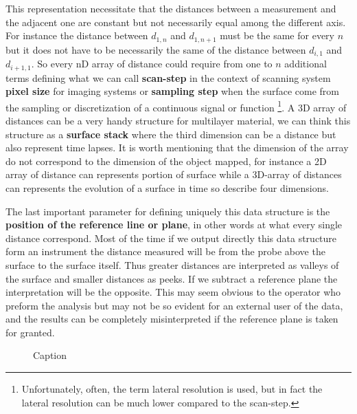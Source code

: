 This representation necessitate that the distances between a measurement and the adjacent one are constant but not necessarily equal among the different axis. For instance the distance between $d_{1,n}$ and $d_{1,n+1}$ must be the same for every $n$ but it does not have to be necessarily the same of the distance between $d_{i,1}$ and  $d_{i+1,1}$. So every nD array of distance could require from one to $n$ additional terms defining what we can call \textbf{scan-step} in the context of scanning system \textbf{pixel size} for imaging systems or \textbf{sampling step} when the surface come from the sampling or discretization of a continuous signal or function \footnote{Unfortunately, often, the term lateral resolution is used, but in fact the lateral resolution can be much lower compared to the scan-step.}. A 3D array of distances can be a very handy structure for multilayer material, we can think this structure as a \textbf{surface stack} where the third dimension can be a distance but also represent time lapses. It is worth mentioning that the dimension of the array do not correspond to the dimension of the object mapped, for instance a 2D array of distance can represents portion of surface while a 3D-array of distances can represents the evolution of a surface in time so describe four dimensions. \par
The last important parameter for defining uniquely this data structure is the  \textbf{position of the reference line or plane}, in other words at what every single distance correspond. Most of the time if we output directly this data structure form an instrument the distance measured will be from the probe above the surface to the surface itself. Thus greater distances are interpreted as valleys of the surface and smaller distances as peeks. If we subtract a reference plane the interpretation will be the opposite. This may seem obvious to the operator who preform the analysis but may not be so evident for an external user of the data, and the results can be completely misinterpreted if the reference plane is taken for granted.

\begin{figure}
    \centering
    
    \caption{Caption}
    \label{fig:my_label}
\end{figure}

